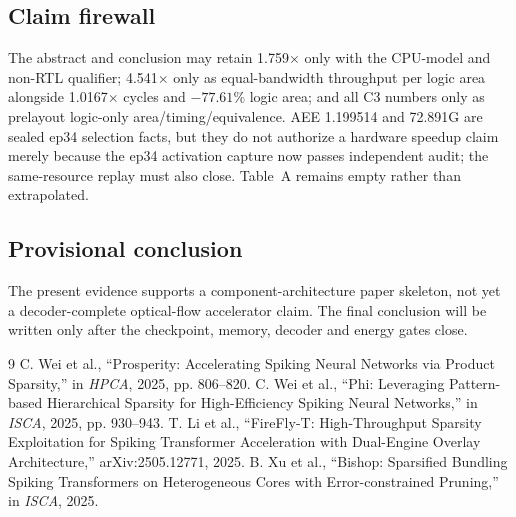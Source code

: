 \documentclass[9pt,twocolumn]{article}
\begin{document}
\subsection{Claim firewall}
The abstract and conclusion may retain 1.759$\times$ only with the CPU-model and
non-RTL qualifier; 4.541$\times$ only as equal-bandwidth throughput per logic area
alongside 1.0167$\times$ cycles and $-77.61\%$ logic area; and all C3 numbers only
as prelayout logic-only area/timing/equivalence.  AEE 1.199514 and 72.891G are sealed ep34 selection facts, but they
do not authorize a hardware speedup claim merely because the ep34 activation
capture now passes independent audit; the same-resource replay must also close.
Table~A remains empty rather than extrapolated.

\subsection{Provisional conclusion}
The present evidence supports a component-architecture paper skeleton, not yet a
decoder-complete optical-flow accelerator claim.  The final conclusion will be
written only after the checkpoint, memory, decoder and energy gates close.

\begin{thebibliography}{9}\footnotesize
{} C. Wei et al., ``Prosperity: Accelerating Spiking Neural
  Networks via Product Sparsity,'' in \emph{HPCA}, 2025, pp. 806--820.
 C. Wei et al., ``Phi: Leveraging Pattern-based Hierarchical
  Sparsity for High-Efficiency Spiking Neural Networks,'' in \emph{ISCA}, 2025,
  pp. 930--943.
 T. Li et al., ``FireFly-T: High-Throughput Sparsity
  Exploitation for Spiking Transformer Acceleration with Dual-Engine Overlay
  Architecture,'' arXiv:2505.12771, 2025.
 B. Xu et al., ``Bishop: Sparsified Bundling Spiking
  Transformers on Heterogeneous Cores with Error-constrained Pruning,'' in
  \emph{ISCA}, 2025.
\end{thebibliography}
\end{document}
